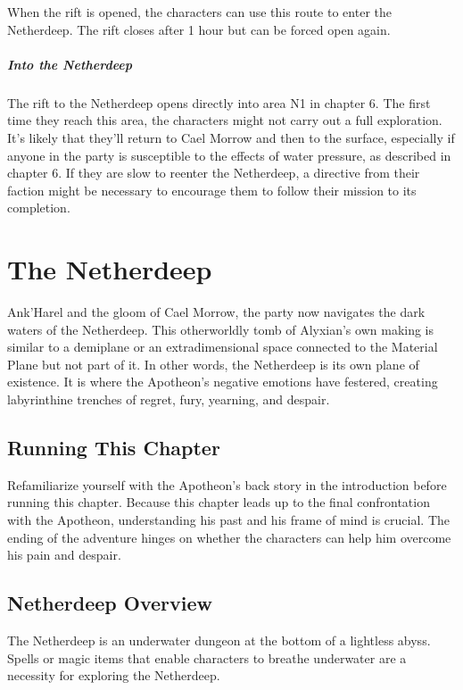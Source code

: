 \documentclass[10pt,a4paper,twoside,bg=print,twocolumn,openany,nodeprecatedcode]{dndbook}
\begin{document}
When the rift is opened, the characters can use this route to enter the Netherdeep. The rift closes after 1 hour but can be forced open again.

\paragraph{Into the Netherdeep}
The rift to the Netherdeep opens directly into area N1 in chapter 6. The first time they reach this area, the characters might not carry out a full exploration. It's likely that they'll return to Cael Morrow and then to the surface, especially if anyone in the party is susceptible to the effects of water pressure, as described in chapter 6. If they are slow to reenter the Netherdeep, a directive from their faction might be necessary to encourage them to follow their mission to its completion.

\chapter{The Netherdeep}
 Ank'Harel and the gloom of Cael Morrow, the party now navigates the dark waters of the Netherdeep. This otherworldly tomb of Alyxian's own making is similar to a demiplane or an extradimensional space connected to the Material Plane but not part of it. In other words, the Netherdeep is its own plane of existence. It is where the Apotheon's negative emotions have festered, creating labyrinthine trenches of regret, fury, yearning, and despair.

\section{Running This Chapter}
Refamiliarize yourself with the Apotheon's back story in the introduction before running this chapter. Because this chapter leads up to the final confrontation with the Apotheon, understanding his past and his frame of mind is crucial. The ending of the adventure hinges on whether the characters can help him overcome his pain and despair.

\section{Netherdeep Overview}
The Netherdeep is an underwater dungeon at the bottom of a lightless abyss. Spells or magic items that enable characters to breathe underwater are a necessity for exploring the Netherdeep.
\end{document}
